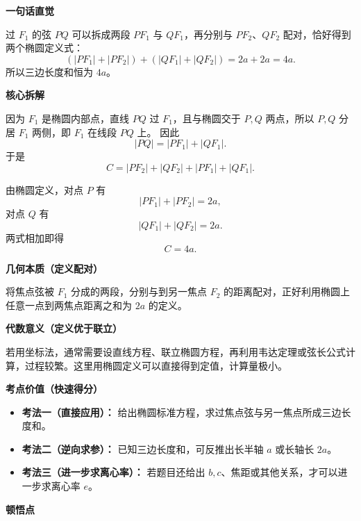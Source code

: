 \begin{explanationbox}
	\textbf{\textcolor{CExplanation}{一句话直觉}}

	过 $F_1$ 的弦 $PQ$ 可以拆成两段 $PF_1$ 与 $QF_1$，再分别与 $PF_2$、$QF_2$ 配对，恰好得到两个椭圆定义式：
	\[
		(|PF_1|+|PF_2|)+(|QF_1|+|QF_2|)=2a+2a=4a.
	\]
	所以三边长度和恒为 $4a$。

	\medskip
	\textbf{\textcolor{CExplanation}{核心拆解}}
	\begin{description}[style=nextline, leftmargin=2.8em, labelsep=0.5em, itemsep=0.45em]
		\item[\textbf{要点一（弦长拆分）：}]
		      因为 $F_1$ 是椭圆内部点，直线 $PQ$ 过 $F_1$，且与椭圆交于 $P,Q$ 两点，所以 $P,Q$ 分居 $F_1$ 两侧，即 $F_1$ 在线段 $PQ$ 上。
		      因此
		      \[
			      |PQ|=|PF_1|+|QF_1|.
		      \]
		      于是
		      \[
			      C=|PF_2|+|QF_2|+|PF_1|+|QF_1|.
		      \]

		\item[\textbf{要点二（定义代入）：}]
		      由椭圆定义，对点 $P$ 有
		      \[
			      |PF_1|+|PF_2|=2a,
		      \]
		      对点 $Q$ 有
		      \[
			      |QF_1|+|QF_2|=2a.
		      \]
		      两式相加即得
		      \[
			      C=4a.
		      \]
	\end{description}

	\medskip
	\textbf{\textcolor{CExplanation}{几何本质（定义配对）}}

	将焦点弦被 $F_1$ 分成的两段，分别与到另一焦点 $F_2$ 的距离配对，正好利用椭圆上任意一点到两焦点距离之和为 $2a$ 的定义。

	\medskip
	\textbf{\textcolor{CExplanation}{代数意义（定义优于联立）}}

	若用坐标法，通常需要设直线方程、联立椭圆方程，再利用韦达定理或弦长公式计算，过程较繁。这里用椭圆定义可以直接得到定值，计算量极小。

	\medskip
	\textbf{\textcolor{CExplanation}{考点价值（快速得分）}}
	\begin{itemize}[leftmargin=*, itemsep=0.5em, topsep=0.4em]
		\item \textbf{考法一（直接应用）：} 给出椭圆标准方程，求过焦点弦与另一焦点所成三边长度和。
		\item \textbf{考法二（逆向求参）：} 已知三边长度和，可反推出长半轴 $a$ 或长轴长 $2a$。
		\item \textbf{考法三（进一步求离心率）：} 若题目还给出 $b,c$、焦距或其他关系，才可以进一步求离心率 $e$。
	\end{itemize}

	\medskip
	\textbf{\textcolor{CExplanation}{顿悟点}}


\end{explanationbox}
